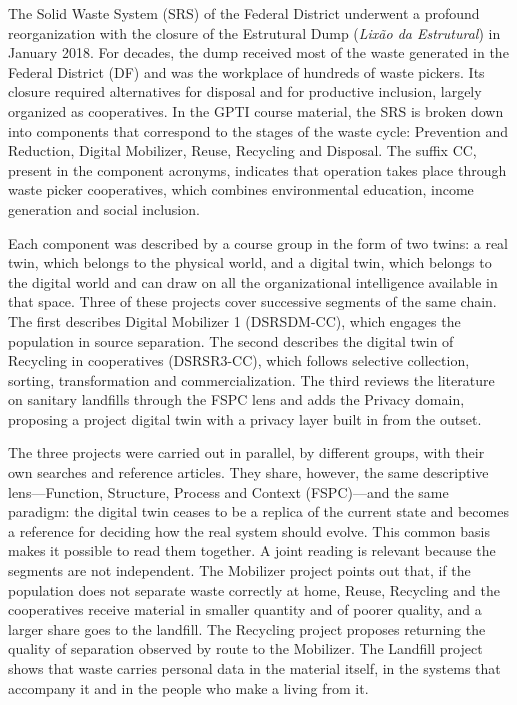 \documentclass[12pt,a4paper,article,oneside,brazil,english]{abntex2}
\begin{document}
The Solid Waste System (SRS) of the Federal District underwent a profound reorganization with the closure of the Estrutural Dump (\textit{Lixão da Estrutural}) in January 2018. For decades, the dump received most of the waste generated in the Federal District (DF) and was the workplace of hundreds of waste pickers. Its closure required alternatives for disposal and for productive inclusion, largely organized as cooperatives. In the GPTI course material, the SRS is broken down into components that correspond to the stages of the waste cycle: Prevention and Reduction, Digital Mobilizer, Reuse, Recycling and Disposal. The suffix CC, present in the component acronyms, indicates that operation takes place through waste picker cooperatives, which combines environmental education, income generation and social inclusion.

Each component was described by a course group in the form of two twins: a real twin, which belongs to the physical world, and a digital twin, which belongs to the digital world and can draw on all the organizational intelligence available in that space. Three of these projects cover successive segments of the same chain. The first describes Digital Mobilizer 1 (DSRSDM-CC), which engages the population in source separation. The second describes the digital twin of Recycling in cooperatives (DSRSR3-CC), which follows selective collection, sorting, transformation and commercialization. The third reviews the literature on sanitary landfills through the FSPC lens and adds the Privacy domain, proposing a project digital twin with a privacy layer built in from the outset.

The three projects were carried out in parallel, by different groups, with their own searches and reference articles. They share, however, the same descriptive lens---Function, Structure, Process and Context (FSPC)---and the same paradigm: the digital twin ceases to be a replica of the current state and becomes a reference for deciding how the real system should evolve. This common basis makes it possible to read them together. A joint reading is relevant because the segments are not independent. The Mobilizer project points out that, if the population does not separate waste correctly at home, Reuse, Recycling and the cooperatives receive material in smaller quantity and of poorer quality, and a larger share goes to the landfill. The Recycling project proposes returning the quality of separation observed by route to the Mobilizer. The Landfill project shows that waste carries personal data in the material itself, in the systems that accompany it and in the people who make a living from it.
\end{document}
